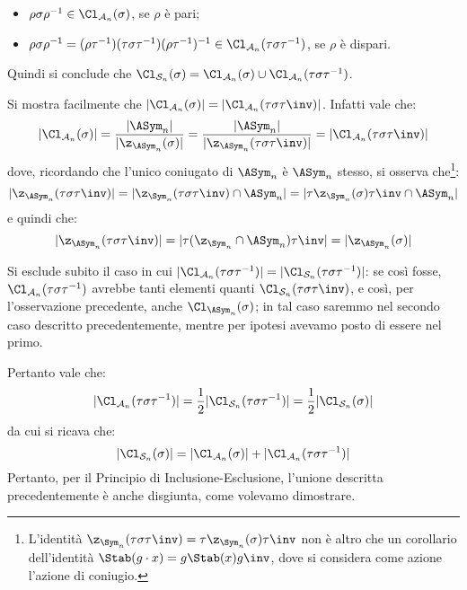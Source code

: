 \documentclass[11pt]{scrartcl}
\begin{document}
	\begin{itemize}
		\item $\rho\sigma\rho^{-1} \in \Cl_{\mathcal{A}_n}(\sigma)$, se $\rho$ è pari;
		\item 	$\rho\sigma\rho^{-1} = (\rho\tau^{-1})(\tau\sigma\tau^{-1})(\rho\tau^{-1})^{-1}
		\in \Cl_{\mathcal{A}_n}(\tau\sigma\tau^{-1})$, se $\rho$ è dispari.
	\end{itemize}
	
	Quindi si conclude che $\Cl_{\mathcal{S}_n}(\sigma) = \Cl_{\mathcal{A}_n}(\sigma) \cup
	\Cl_{\mathcal{A}_n}(\tau\sigma\tau^{-1})$.
	
	
	\begin{remark}
		Si mostra facilmente che $\lvert \Cl_{\mathcal{A}_n}(\sigma) \rvert  = \lvert \Cl_{\mathcal{A}_n}(\tau \sigma \tau\inv) \rvert$. Infatti vale che:
		\[ \lvert \Cl_{\mathcal{A}_n}(\sigma) \rvert = \frac{\lvert \ASym_n \rvert}{\lvert \z_{\ASym_n}(\sigma) \rvert} = \frac{\lvert \ASym_n \rvert}{\lvert \z_{\ASym_n}(\tau \sigma \tau\inv) \rvert} = \lvert \Cl_{\mathcal{A}_n}(\tau \sigma \tau\inv) \rvert \]
		dove, ricordando che l'unico coniugato di $\ASym_n$ è $\ASym_n$ stesso, si osserva che\footnote{
			L'identità $\z_{\Sym_n}(\tau \sigma \tau\inv) = \tau \z_{\Sym_n}(\sigma) \tau\inv$
			non è altro che un corollario dell'identità $\Stab(g \cdot x) = g \Stab(x) g\inv$,
			dove si considera come azione l'azione di coniugio.
		}:
		\[ \lvert \z_{\ASym_n}(\tau \sigma \tau\inv) \rvert = \lvert \z_{\Sym_n}(\tau \sigma \tau\inv) \cap \ASym_n \rvert = \lvert \tau \z_{\Sym_n}(\sigma) \tau\inv \cap \ASym_n \rvert \]
		e quindi che:
		\[ \lvert \z_{\ASym_n}(\tau \sigma \tau\inv) \rvert = \lvert \tau ( \z_{\Sym_n} \cap \ASym_n) \tau\inv \rvert = \lvert \z_{\ASym_n}(\sigma) \rvert \]
	\end{remark}
	
	
	Si esclude subito il caso in cui $\lvert \Cl_{\mathcal{A}_n}(\tau\sigma\tau^{-1}) \rvert = \lvert \Cl_{\mathcal{S}_n}(\tau\sigma\tau^{-1}) \rvert$: se così fosse,
	$\Cl_{\mathcal{A}_n}(\tau\sigma\tau^{-1})$ avrebbe tanti elementi quanti
	$\Cl_{\mathcal{S}_n}(\tau\sigma\tau\inv)$, e così, per l'osservazione precedente, anche $\Cl_{\ASym_n}(\sigma)$; in
	tal caso saremmo nel secondo caso descritto precedentemente, mentre per ipotesi avevamo
	posto di essere nel primo. \medskip
	
	
	Pertanto vale che:
	\[ \lvert \Cl_{\mathcal{A}_n}(\tau\sigma\tau^{-1}) \rvert = \frac{1}{2} \lvert \Cl_{\mathcal{S}_n}(\tau\sigma\tau^{-1}) \rvert = \frac{1}{2} \lvert \Cl_{\mathcal{S}_n}(\sigma) \rvert \]
	da cui si ricava che:
	\[ \lvert \Cl_{\mathcal{S}_n}(\sigma) \rvert = \lvert \Cl_{\mathcal{A}_n}(\sigma) \rvert + \lvert \Cl_{\mathcal{A}_n}(\tau\sigma\tau^{-1}) \rvert \]
	Pertanto, per il Principio di Inclusione-Esclusione, l'unione descritta precedentemente
	è anche disgiunta, come volevamo dimostrare. \medskip
	
\end{document}
